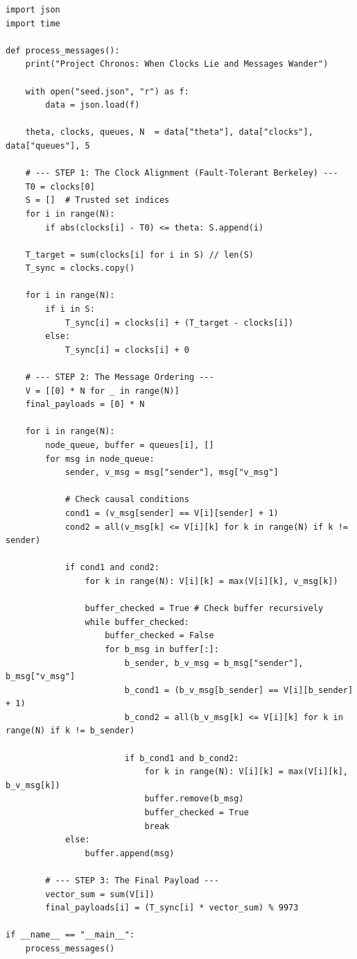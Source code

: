 \documentclass[11pt]{article}
\begin{document}
\begin{codebox}[chronos.py]
\begin{lstlisting}
import json
import time

def process_messages():
    print("Project Chronos: When Clocks Lie and Messages Wander")
    
    with open("seed.json", "r") as f:
        data = json.load(f)
        
    theta, clocks, queues, N  = data["theta"], data["clocks"], data["queues"], 5
    
    # --- STEP 1: The Clock Alignment (Fault-Tolerant Berkeley) ---
    T0 = clocks[0]
    S = []  # Trusted set indices
    for i in range(N):
        if abs(clocks[i] - T0) <= theta: S.append(i)
            
    T_target = sum(clocks[i] for i in S) // len(S)
    T_sync = clocks.copy()
    
    for i in range(N):
        if i in S:
            T_sync[i] = clocks[i] + (T_target - clocks[i])
        else:
            T_sync[i] = clocks[i] + 0
        
    # --- STEP 2: The Message Ordering ---
    V = [[0] * N for _ in range(N)]
    final_payloads = [0] * N
    
    for i in range(N):
        node_queue, buffer = queues[i], []
        for msg in node_queue:
            sender, v_msg = msg["sender"], msg["v_msg"]
            
            # Check causal conditions
            cond1 = (v_msg[sender] == V[i][sender] + 1)
            cond2 = all(v_msg[k] <= V[i][k] for k in range(N) if k != sender)
            
            if cond1 and cond2:
                for k in range(N): V[i][k] = max(V[i][k], v_msg[k])
                
                buffer_checked = True # Check buffer recursively
                while buffer_checked:
                    buffer_checked = False
                    for b_msg in buffer[:]:
                        b_sender, b_v_msg = b_msg["sender"], b_msg["v_msg"]
                        b_cond1 = (b_v_msg[b_sender] == V[i][b_sender] + 1)
                        b_cond2 = all(b_v_msg[k] <= V[i][k] for k in range(N) if k != b_sender)
                        
                        if b_cond1 and b_cond2:
                            for k in range(N): V[i][k] = max(V[i][k], b_v_msg[k])
                            buffer.remove(b_msg)
                            buffer_checked = True 
                            break 
            else:
                buffer.append(msg)
                
        # --- STEP 3: The Final Payload ---
        vector_sum = sum(V[i])
        final_payloads[i] = (T_sync[i] * vector_sum) % 9973

if __name__ == "__main__":
    process_messages()
\end{lstlisting}
\end{codebox}
\end{document}
